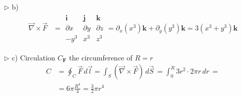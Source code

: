 \documentclass[a4paper]{article}
\begin{document}
$\triangleright$ b)
\begin{align}
\vec{\nabla}\times \vec{F}&=\begin{array}{|ccc|} 
\mathbf{i} & \mathbf{j} & \mathbf{k} \\
\partial x & \partial y & \partial z \\
-y^{3} & x^{3} & z^{3}
\end{array} =\partial_{x}(x^{3})\mathbf{k}+\partial_{y}(y^{3})\mathbf{k}=\boxed{3(x^{3}+y^{3})\mathbf{k}}
\end{align}

$\triangleright$ c) Circulation $C_{\mathbf{F}}$ the circumference of $R=r$
\begin{align}
C&=\oint_{C}\vec{F}\,d\vec{l}=\int _{S}(\vec{\nabla}\times \vec{F}) \, d\vec{S}\,=\int_{0}^{R} 3r^{2}\cdot 2\pi r \, dr\,= \\
&=6\pi \frac{R^{4}}{4}=\boxed{\frac{3}{2}\pi r^{4} } 
\end{align}
\end{document}
